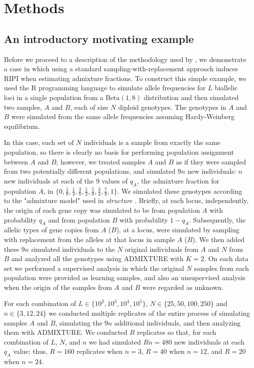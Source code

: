 \section*{Methods}

\subsection*{An introductory motivating example}


Before we proceed to a description of the methodology used by \gscramble{},
we demonstrate a case in which using a standard sampling-with-replacement
approach induces RIPI when estimating admixture fractions.
To construct this simple example, we used the R programming language \citep{Rcoreteam} to
simulate allele frequencies for $L$ biallelic
loci in a single population from a $\mathrm{Beta}(1, 8)$ distribution and then simulated
two samples, $A$ and $B$, each of size $N$ diploid genotypes. The genotypes in $A$ and $B$ were simulated
from the same allele frequencies assuming Hardy-Weinberg equilibrium.

In this case,
each set of $N$ individuals is a sample from exactly the same population, so
there is clearly no basis for performing population assignment between $A$ and $B$;
however, we treated samples $A$ and $B$ as if they were sampled from two potentially different
populations, and simulated $9n$ new individuals: $n$ new individuals at each of the 9 values of
$q_A$, the admixture fraction for population $A$, in  $\{0, \frac{1}{8}, \frac{1}{4}, \frac{3}{8}, \frac{1}{2}, \frac{5}{8}, \frac{3}{4}, \frac{7}{8}, 1\}$.
We simulated these genotypes according to the "admixture model" used in {\em structure} \citep{pritchard2000inference}.  Briefly, at each
locus, independently, the origin
of each gene copy was simulated to be from
population $A$ with probability $q_A$ and from population $B$ with probability $1-q_A$.  Subsequently,
the allelic types of gene copies from $A$ ($B$), at a locus, were simulated by sampling with replacement
from the alleles at that locus in sample $A$ ($B$).
We then added these $9n$ simulated individuals to the $N$ original individuals  from $A$ and $N$ from $B$
and analyzed all the genotypes using ADMIXTURE with $K=2$. On each data set we performed a supervised analysis in which the original
$N$ samples from each
population were provided as learning samples, and also an
unsupervised analysis when the origin of the samples from $A$ and $B$ were regarded as unknown.

For each combination of $L \in \{10^2, 10^3, 10^4, 10^5\}$,
$N \in \{25, 50, 100, 250\}$ and $n\in\{3,12,24\}$ we conducted multiple replicates
of the entire process of
simulating samples $A$ and $B$, simulating the $9n$ additional individuals, and
then analyzing them with ADMIXTURE.  We conducted $R$ replicates so that,
for each combination of $L$, $N$, and $n$ we had simulated $Rn=480$ new individuals
at each $q_A$ value; thus, $R=160$ replicates when $n = 3$, $R=40$ when $n=12$, and
$R=20$ when $n=24$.



